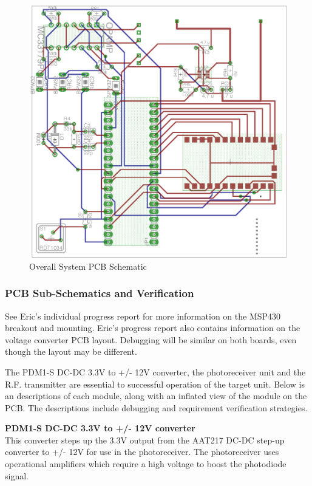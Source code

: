 \documentclass[letterpaper,10pt]{article}
\begin{document}
\begin{spacing}{1.15}
\begin{figure} [H]
	\centering
	\includegraphics[scale=1.5]{system-pcb.png}
	\caption{Overall System PCB Schematic\label{fig:system-pcb}}
\end{figure}

\subsubsection{PCB Sub-Schematics and Verification}
See Eric's individual progress report for more information on the MSP430 breakout and mounting. Eric's progress report also contains information on the voltage converter PCB layout. Debugging will be similar on both boards, even though the layout may be different. 

The PDM1-S DC-DC 3.3V to +/- 12V converter, the photoreceiver unit and the R.F. transmitter are essential to successful operation of the target unit. Below is an descriptions of each module, along with an inflated view of the module on the PCB. The descriptions include debugging and requirement verification strategies. 

\normalsize\textbf{PDM1-S DC-DC 3.3V to +/- 12V converter}\\
This converter steps up the 3.3V output from the AAT217 DC-DC step-up converter to +/- 12V for use in the photoreceiver. The photoreceiver uses operational amplifiers which require a high voltage to boost the photodiode signal.


\end{spacing}
\end{document}
